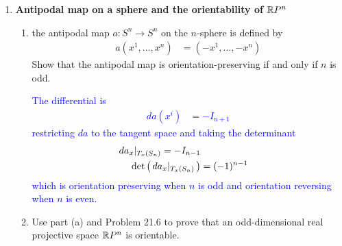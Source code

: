 \documentclass[12pt,a4paper]{report}
\newcommand{\BLUE}[1]{\textcolor{blue}{#1}}
\begin{document}
\begin{enumerate}[label=22.\arabic*]
\item \textbf{Antipodal map on a sphere and the orientability of $\mathbb{R} P^n$}

\begin{enumerate}
	\item the antipodal map $a: S^n\to S^n$ on the $n$-sphere is defined by
	\begin{align*}
		a(x^1,\dots,x^n) &= (-x^1,\dots,-x^n)
	\end{align*}Show that the antipodal map is orientation-preserving if and only if $n$ is odd.
	
	\BLUE{The differential is 
	\begin{align*}
		da(x^i) &= -I_{n+1}
	\end{align*}restricting $da$ to the tangent space and taking the determinant
	\begin{align*}
		da_x|_{T_x(S_n)} = -I_{n-1} \\
		\det\left (\, da_x|_{T_x(S_n)} \,\right ) &= (-1)^{n-1}
	\end{align*}which is orientation preserving when $n$ is odd and orientation reversing when $n$ is even.
	}
	
	\item Use part (a) and Problem 21.6 to prove that an odd-dimensional real projective space $\mathbb{R} P^n$ is orientable.
\end{enumerate}
\end{enumerate}
\end{document}
